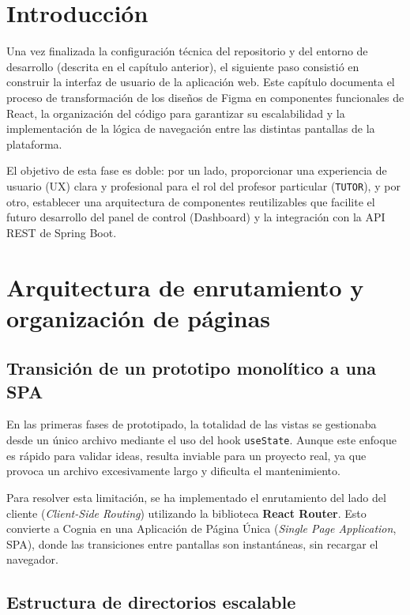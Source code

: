 \documentclass[12pt,a4paper]{report}
\begin{document}
\section{Introducción}

Una vez finalizada la configuración técnica del repositorio y del entorno de desarrollo (descrita en el capítulo anterior), el siguiente paso consistió en construir la interfaz de usuario de la aplicación web. Este capítulo documenta el proceso de transformación de los diseños de Figma en componentes funcionales de React, la organización del código para garantizar su escalabilidad y la implementación de la lógica de navegación entre las distintas pantallas de la plataforma.

El objetivo de esta fase es doble: por un lado, proporcionar una experiencia de usuario (UX) clara y profesional para el rol del profesor particular (\texttt{TUTOR}), y por otro, establecer una arquitectura de componentes reutilizables que facilite el futuro desarrollo del panel de control (Dashboard) y la integración con la API REST de Spring Boot.

\section{Arquitectura de enrutamiento y organización de páginas}

\subsection{Transición de un prototipo monolítico a una SPA}

En las primeras fases de prototipado, la totalidad de las vistas se gestionaba desde un único archivo  mediante el uso del hook \texttt{useState}. Aunque este enfoque es rápido para validar ideas, resulta inviable para un proyecto real, ya que provoca un archivo excesivamente largo y dificulta el mantenimiento.

Para resolver esta limitación, se ha implementado el enrutamiento del lado del cliente (\textit{Client-Side Routing}) utilizando la biblioteca \textbf{React Router}. Esto convierte a Cognia en una Aplicación de Página Única (\textit{Single Page Application}, SPA), donde las transiciones entre pantallas son instantáneas, sin recargar el navegador.

\subsection{Estructura de directorios escalable}
\end{document}
